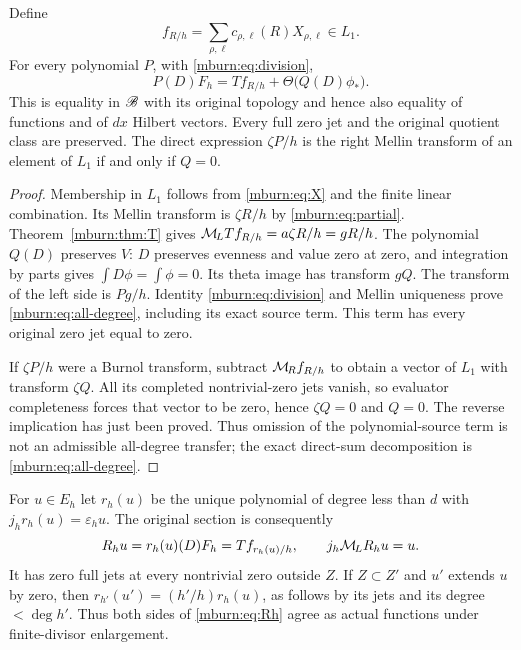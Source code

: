 \begin{mburntheorem}
\label{mburn:thm:all-degree}
Define
\begin{equation}\label{mburn:eq:fR}
 f_{R/h}=\sum_{\rho,\ell}c_{\rho,\ell}(R)X_{\rho,\ell}\in L_1.
\end{equation}
For every polynomial $P$, with \eqref{mburn:eq:division},
\begin{equation}\label{mburn:eq:all-degree}
 \boxed{\quad P(D)F_h=T f_{R/h}+\Theta\bigl(Q(D)\phi_*\bigr).\quad}
\end{equation}
This is equality in $\mathscr B$ with its original topology and hence
also equality of functions and of $dx$ Hilbert vectors. Every
full zero jet and the original quotient class are preserved.
The direct expression $\zeta P/h$ is the right Mellin transform
of an element of $L_1$ if and only if $Q=0$.
\end{mburntheorem}
\begin{proof}
Membership in $L_1$ follows from \eqref{mburn:eq:X} and the finite
linear combination. Its Mellin transform is $\zeta R/h$ by
\eqref{mburn:eq:partial}. Theorem~\ref{mburn:thm:T} gives
$\mathcal M_{\!L} T f_{R/h}=a\zeta R/h=gR/h$. The polynomial $Q(D)$
preserves $V$: $D$ preserves evenness and value zero at zero,
and integration by parts gives $\int D\phi=\int\phi=0$.
Its theta image has transform $gQ$. The transform of the left
side is $Pg/h$. Identity \eqref{mburn:eq:division} and Mellin
uniqueness prove \eqref{mburn:eq:all-degree}, including its exact
source term. This term has every original zero jet equal to zero.

If $\zeta P/h$ were a Burnol transform, subtract
$\mathcal M_{\!R} f_{R/h}$ to obtain a vector of $L_1$ with transform
$\zeta Q$. All its completed nontrivial-zero jets vanish,
so evaluator completeness forces that vector to be zero, hence
$\zeta Q=0$ and $Q=0$. The reverse implication has just been
proved. Thus omission of the polynomial-source term is not
an admissible all-degree transfer; the exact direct-sum
decomposition is \eqref{mburn:eq:all-degree}.
\end{proof}

For $u\in E_h$ let $r_h(u)$ be the unique polynomial of degree
less than $d$ with $j_hr_h(u)=\varepsilon_hu$. The original
section is consequently
\begin{equation}\label{mburn:eq:Rh}
 R_hu=r_h(u)(D)F_h=T f_{r_h(u)/h},\qquad
 j_h\mathcal M_{\!L} R_hu=u.
\end{equation}
It has zero full jets at every nontrivial zero outside $Z$.
If $Z\subset Z'$ and $u'$ extends $u$ by zero, then
$r_{h'}(u')=(h'/h)r_h(u)$, as follows by its jets and its
degree $<\deg h'$. Thus both sides of \eqref{mburn:eq:Rh} agree
as actual functions under finite-divisor enlargement.

